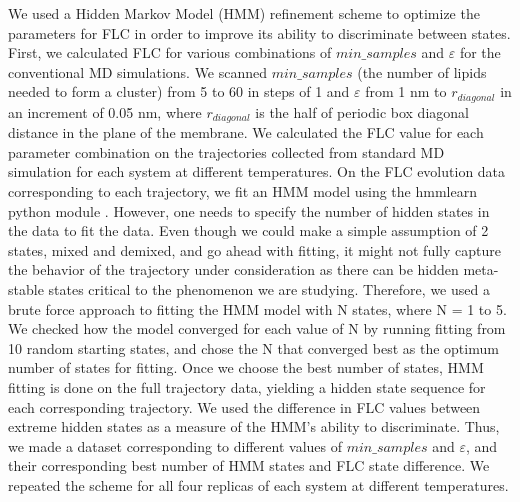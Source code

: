 \documentclass{biophys-new}
\begin{document}
We used a Hidden Markov Model (HMM) \cite{hmmlearn} refinement scheme to optimize the parameters for FLC in order to improve its ability to discriminate between states.
First, we calculated FLC for various combinations of $min\_samples$ and $\varepsilon$ for the conventional MD simulations.
We scanned $min\_samples$ (the number of lipids needed to form a cluster) from 5 to 60 in steps of 1 and $\varepsilon$ from 1 nm to $r_{diagonal}$ in an increment of 0.05 nm,
where $r_{diagonal}$ is the half of periodic box diagonal distance in the plane of the membrane.
We calculated the FLC value for each parameter combination on the trajectories collected from standard MD simulation for each system at different temperatures.
On the FLC evolution data corresponding to each trajectory, we fit an HMM model using the hmmlearn python module \cite{hmmlearn}.
However, one needs to specify the number of hidden states in the data to fit the data.
Even though we could make a simple assumption of 2 states, mixed and demixed, and go ahead with fitting, it might not fully capture the behavior of the trajectory under consideration as there can be hidden meta-stable states critical to the phenomenon we are studying.
Therefore, we used a brute force approach to fitting the HMM model with N states, where N = 1 to 5.
We checked how the model converged for each value of N by running fitting from 10 random starting states, and
chose the N that converged best as the optimum number of states for fitting.
Once we choose the best number of states, HMM fitting is done on the full trajectory data, yielding
a hidden state sequence for each corresponding trajectory.
We used the difference in FLC values between extreme hidden states as a measure of the HMM's ability to discriminate.
Thus, we made a dataset corresponding to different values of $min\_samples$ and $\varepsilon$, and their corresponding best number of HMM states and FLC state difference.
We repeated the scheme for all four replicas of each system at different temperatures.
\end{document}
